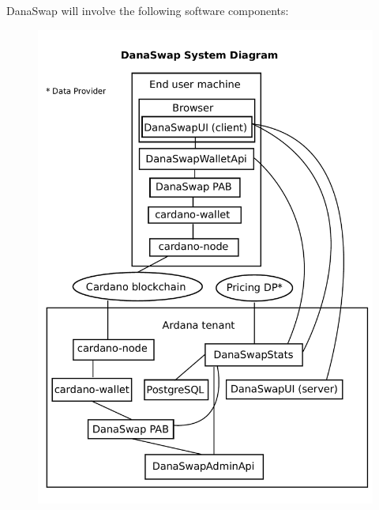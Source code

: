 \documentclass[12pt]{article}
\begin{document}
DanaSwap will involve the following software components:

\begin{figure}
\includegraphics[width=1.0\columnwidth]{system-diagram.pdf}
\end{figure}
\end{document}
